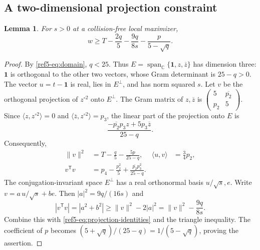\documentclass[11pt]{article}
\newtheorem{lemma}[theorem]{Lemma}
\theoremstyle{remark}
\newcommand{\C}{\mathbb C}
\newcommand{\one}{\mathbf 1}
\newcommand{\norm}[1]{\lVert#1\rVert}
\newcommand{\ip}[2]{\langle#1,#2\rangle}
\numberwithin{equation}{section}
\begin{document}
\subsection{A two-dimensional projection constraint}
\begin{lemma}\label{ref5-lem:projection}
For $s>0$ at a collision-free local maximizer,
\begin{equation}\label{ref5-eq:w-lower}
 w\ge T-\frac{2q}{5}-\frac{9q}{8s}-\frac{p}{5-\sqrt q}.
\end{equation}
\end{lemma}
\begin{proof}
By \eqref{ref5-eq:domain}, $q<25$.
Thus $E=\operatorname{span}_{\C}\{\one,z,\overline z\}$ has
dimension three: $\one$ is orthogonal to the other two vectors, whose
Gram determinant is $25-q>0$.
The vector $u=t-\one$ is real, lies in $E^\perp$, and has norm squared $s$.
Let $v$ be the orthogonal projection of $z^{\circ2}$ onto $E^\perp$.
The Gram matrix of $z,\overline z$ is
$\left(\begin{smallmatrix}5&\overline{p_2}\\p_2&5\end{smallmatrix}\right)$.
Since $\ip z {z^{\circ2}}=0$ and
$\ip{\overline z}{z^{\circ2}}=p_3$, the linear part of the
projection onto $E$ is
\[
 \frac{-\overline{p_2}p_3z+5p_3\overline z}{25-q}.
\]
Consequently,
\begin{equation}\label{ref5-eq:projection-identities}
\begin{aligned}
 \norm v^2&=T-\frac q5-\frac{5p}{25-q},&
 \ip u v&=\frac34p_2,\\
 v^{\mathsf T}v&=p_4-\frac{p_2^2}{5}
    +\frac{\overline{p_2}p_3^2}{25-q}.
\end{aligned}
\end{equation}
The conjugation-invariant space $E^\perp$ has a real orthonormal basis
$u/\sqrt s,e$. Write $v=a\,u/\sqrt s+b e$.
Then $|a|^2=9q/(16s)$ and
\[
 |v^{\mathsf T}v|=|a^2+b^2|
 \ge\norm v^2-2|a|^2
 =\norm v^2-\frac{9q}{8s}.
\]
Combine this with \eqref{ref5-eq:projection-identities} and the triangle
inequality. The coefficient of $p$ becomes
$(5+\sqrt q)/(25-q)=1/(5-\sqrt q)$, proving the assertion.
\end{proof}
\end{document}
